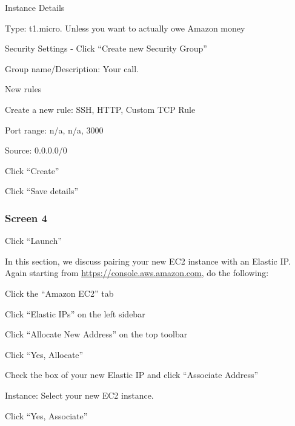\documentclass{article}
\begin{document}
\begin{enumerate*}
\item Instance Details
\begin{enumerate*}
\item Type: t1.micro. Unless you want to actually owe Amazon money
\end{enumerate*}
\item Security Settings - Click ``Create new Security Group''
\begin{enumerate*}
\item Group name/Description: Your call.
\item New rules
\begin{enumerate*}
\item Create a new rule: SSH, HTTP, Custom TCP Rule
\item Port range: n/a, n/a, 3000
\item Source: 0.0.0.0/0
\end{enumerate*}
\item Click ``Create''
\end{enumerate*}
\item Click ``Save details''
\end{enumerate*}

\subsubsection*{Screen 4}

Click ``Launch''


In this section, we discuss pairing your new EC2 instance with an Elastic IP. Again starting from \href{https://console.aws.amazon.com}{https://console.aws.amazon.com}, do the following:

\begin{enumerate*}
\item Click the ``Amazon EC2'' tab
\item Click ``Elastic IPs'' on the left sidebar
\item Click ``Allocate New Address'' on the top toolbar
\item Click ``Yes, Allocate''
\item Check the box of your new Elastic IP and click ``Associate Address''
\begin{enumerate*}
\item Instance: Select your new EC2 instance.
\item Click ``Yes, Associate''
\end{enumerate*}
\end{enumerate*}
\end{document}
